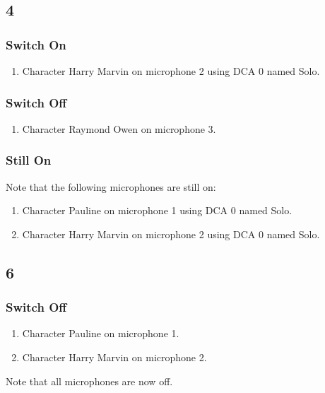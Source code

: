 \subsection* {4}
\subsubsection* {Switch On}
\begin{enumerate}
\item Character Harry Marvin on microphone 2 using DCA 0 named Solo.
\end{enumerate}
\subsubsection* {Switch Off}
\begin{enumerate}
\item Character Raymond Owen on microphone 3.
\end{enumerate}
\subsubsection* {Still On}
Note that the following microphones are still on:
\begin{enumerate}
\item Character Pauline on microphone 1 using DCA 0 named Solo.
\item Character Harry Marvin on microphone 2 using DCA 0 named Solo.
\end{enumerate}
\subsection* {6}
\subsubsection* {Switch Off}
\begin{enumerate}
\item Character Pauline on microphone 1.
\item Character Harry Marvin on microphone 2.
\end{enumerate}
Note that all microphones are now off.
